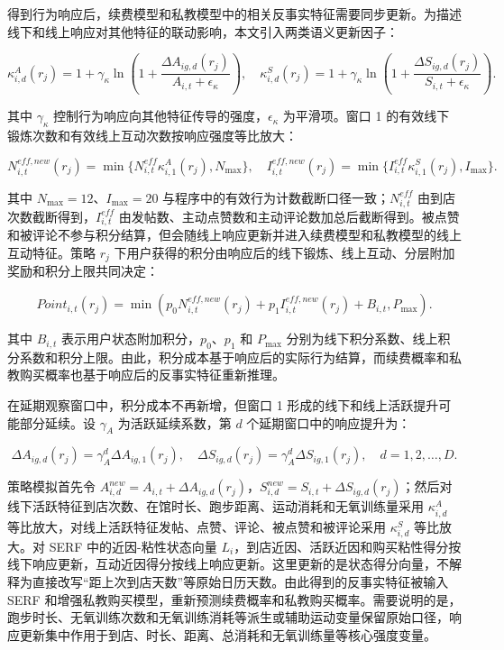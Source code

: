\documentclass[
  12pt,
]{ctexart}
\begin{document}
得到行为响应后，续费模型和私教模型中的相关反事实特征需要同步更新。为描述线下和线上响应对其他特征的联动影响，本文引入两类语义更新因子：

\[
\kappa_{i,d}^{A}(r_j)=1+\gamma_\kappa\ln\left(1+\frac{\Delta A_{ig,d}(r_j)}{A_{i,t}+\epsilon_\kappa}\right),
\quad
\kappa_{i,d}^{S}(r_j)=1+\gamma_\kappa\ln\left(1+\frac{\Delta S_{ig,d}(r_j)}{S_{i,t}+\epsilon_\kappa}\right).
\tag{25}
\]

其中 \(\gamma_\kappa\) 控制行为响应向其他特征传导的强度，\(\epsilon_\kappa\) 为平滑项。窗口 1 的有效线下锻炼次数和有效线上互动次数按响应强度等比放大：

\[
N_{i,t}^{eff,new}(r_j)=\min\{N_{i,t}^{eff}\kappa_{i,1}^{A}(r_j),N_{\max}\},
\quad
I_{i,t}^{eff,new}(r_j)=\min\{I_{i,t}^{eff}\kappa_{i,1}^{S}(r_j),I_{\max}\}.
\tag{26}
\]

其中 \(N_{\max}=12\)、\(I_{\max}=20\) 与程序中的有效行为计数截断口径一致；\(N_{i,t}^{eff}\) 由到店次数截断得到，\(I_{i,t}^{eff}\) 由发帖数、主动点赞数和主动评论数加总后截断得到。被点赞和被评论不参与积分结算，但会随线上响应更新并进入续费模型和私教模型的线上互动特征。策略 \(r_j\) 下用户获得的积分由响应后的线下锻炼、线上互动、分层附加奖励和积分上限共同决定：

\[
Point_{i,t}(r_j)=\min(p_0N_{i,t}^{eff,new}(r_j)+p_1I_{i,t}^{eff,new}(r_j)+B_{i,t},P_{\max}).
\tag{27}
\]

其中 \(B_{i,t}\) 表示用户状态附加积分，\(p_0\)、\(p_1\) 和 \(P_{\max}\) 分别为线下积分系数、线上积分系数和积分上限。由此，积分成本基于响应后的实际行为结算，而续费概率和私教购买概率也基于响应后的反事实特征重新推理。

在延期观察窗口中，积分成本不再新增，但窗口 1 形成的线下和线上活跃提升可能部分延续。设 \(\gamma_A\) 为活跃延续系数，第 \(d\) 个延期窗口中的响应提升为：

\[
\Delta A_{ig,d}(r_j)=\gamma_A^d\Delta A_{ig,1}(r_j),\quad
\Delta S_{ig,d}(r_j)=\gamma_A^d\Delta S_{ig,1}(r_j),\quad d=1,2,\ldots,D.
\tag{28}
\]

策略模拟首先令 \(A_{i,d}^{new}=A_{i,t}+\Delta A_{ig,d}(r_j)\)，\(S_{i,d}^{new}=S_{i,t}+\Delta S_{ig,d}(r_j)\)；然后对线下活跃特征到店次数、在馆时长、跑步距离、运动消耗和无氧训练量采用 \(\kappa_{i,d}^{A}\) 等比放大，对线上活跃特征发帖、点赞、评论、被点赞和被评论采用 \(\kappa_{i,d}^{S}\) 等比放大。对 SERF 中的近因-粘性状态向量 \(L_i\)，到店近因、活跃近因和购买粘性得分按线下响应更新，互动近因得分按线上响应更新。这里更新的是状态得分向量，不解释为直接改写``距上次到店天数''等原始日历天数。由此得到的反事实特征被输入 SERF 和增强私教购买模型，重新预测续费概率和私教购买概率。需要说明的是，跑步时长、无氧训练次数和无氧训练消耗等派生或辅助运动变量保留原始口径，响应更新集中作用于到店、时长、距离、总消耗和无氧训练量等核心强度变量。
\end{document}
